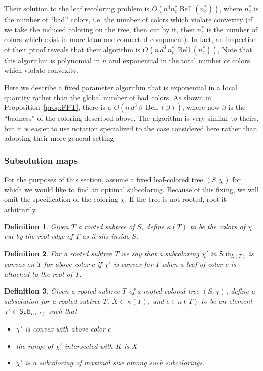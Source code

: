 \documentclass{amsart}
\newcommand{\col}{\chi}
\newcommand{\subcol}{\chi'}
\newcommand{\subcolS}{\mathsf{Sub}}
\newcommand{\subcolST}{\subcolS_{L(T)}}
\newcommand{\cut}{\kappa}
\newcommand{\bad}{\beta}
\newcommand{\Bell}{\operatorname{Bell}}
\newcommand{\nbadcolors}{n_c^*}
\newtheorem{defn}{Definition}
\begin{document}
Their solution to the leaf recoloring problem is $O(n^4 \nbadcolors \Bell(\nbadcolors))$, where $\nbadcolors$ is the number of ``bad'' colors,
i.e. the number of colors which violate convexity (if we take the induced coloring on the tree, then cut by it, then
$\nbadcolors$ is the number of colors which exist in more than one connected component).
In fact, an inspection of their proof reveals that their algorithm is $O(n \, d^3 \, \nbadcolors \, \Bell(\nbadcolors))$,
Note that this algorithm is polynomial in $n$ and exponential in the total number of colors which violate convexity.

Here we describe a fixed parameter algorithm that is exponential in a local quantity rather than the global number of bad colors.
As shown in Proposition~\ref{prop:FPT}, there is a $O(n \, d^3 \, \bad \, \Bell(\bad))$, where now $\bad$ is the ``badness'' of the coloring described above.
The algorithm is very similar to theirs, but it is easier to use notation specialized to the case considered here rather than adopting their more general setting.

\subsubsection{Subsolution maps}

For the purposes of this section, assume a fixed leaf-colored tree $(S, \col)$ for which we would like to find an optimal subcoloring.
Because of this fixing, we will omit the specification of the coloring $\col$.
If the tree is not rooted, root it arbitrarily.

\begin{defn}
  Given $T$ a rooted subtree of $S$, define $\cut(T)$ to be the colors of $\col$ cut by the root edge of $T$ as it sits inside $S$.
\end{defn}

\begin{defn}
  For a rooted subtree $T$ we say that a subcoloring $\subcol$ in $\subcolST$ is convex on $T$ for above color $c$ if $\subcol$ is convex for $T$ when a leaf of color $c$ is attached to the root of $T$.
\end{defn}

\begin{defn}
  \label{defn:subsolution}
  Given a rooted subtree $T$ of a rooted colored tree $(S, \col)$, define a subsolution for a rooted subtree $T$, $X \subset \cut(T)$, and $c \in \cut(T)$ to be an element $\subcol \in \subcolST$ such that
  \begin{itemize}
    \item $\subcol$ is convex with above color $c$
    \item the range of $\subcol$ intersected with $K$ is $X$
    \item $\subcol$ is a subcoloring of maximal size among such subcolorings.
  \end{itemize}
\end{defn}
\end{document}
